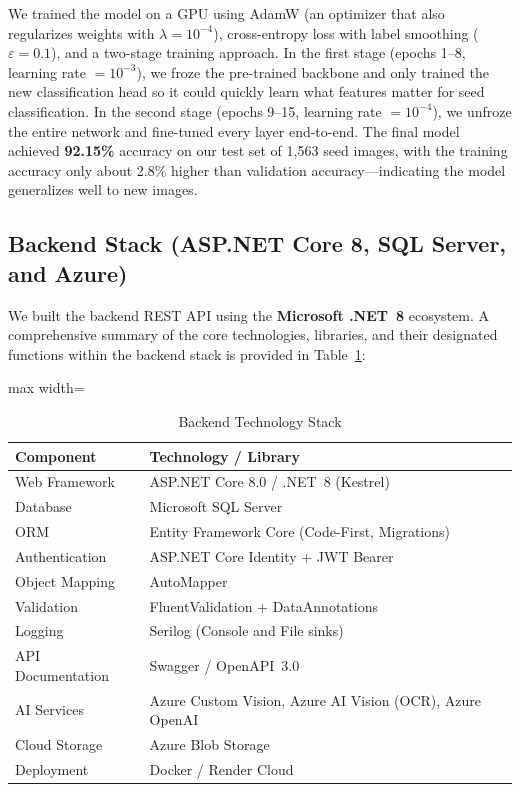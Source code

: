 We trained the model on a GPU using AdamW (an optimizer that also regularizes
weights with $\lambda = 10^{-4}$), cross-entropy loss with label smoothing
($\varepsilon = 0.1$), and a two-stage training approach. In the first stage
(epochs 1–8, learning rate $= 10^{-3}$), we froze the pre-trained backbone and
only trained the new classification head so it could quickly learn what features
matter for seed classification. In the second stage (epochs 9–15, learning rate
$= 10^{-4}$), we unfroze the entire network and fine-tuned every layer end-to-end.
The final model achieved \textbf{92.15\%} accuracy on our test set of 1{,}563 seed
images, with the training accuracy only about 2.8\% higher than validation
accuracy—indicating the model generalizes well to new images.

\subsection{Backend Stack (ASP.NET Core 8, SQL Server, and Azure)}

We built the backend REST API using the \textbf{Microsoft .NET~8} ecosystem.
A comprehensive summary of the core technologies, libraries, and their designated functions within the backend stack is provided in Table~\ref{tab:backend_stack}:

\begin{table}[htbp]
  \centering
  \caption{Backend Technology Stack}
  \label{tab:backend_stack}
  \renewcommand{\arraystretch}{1.35}
  \begin{adjustbox}{max width=\textwidth}
    \begin{tabular}{@{} l l @{}}
      \toprule
      \textbf{Component}   & \textbf{Technology / Library} \\
      \midrule
      Web Framework        & ASP.NET Core 8.0 / .NET~8 (Kestrel) \\
      Database             & Microsoft SQL Server \\
      ORM                  & Entity Framework Core (Code-First, Migrations) \\
      Authentication       & ASP.NET Core Identity + JWT Bearer \\
      Object Mapping       & AutoMapper \\
      Validation           & FluentValidation + DataAnnotations \\
      Logging              & Serilog (Console and File sinks) \\
      API Documentation    & Swagger / OpenAPI~3.0 \\
      AI Services          & Azure Custom Vision, Azure AI Vision (OCR), Azure OpenAI \\
      Cloud Storage        & Azure Blob Storage \\
      Deployment           & Docker / Render Cloud \\
      \bottomrule
    \end{tabular}
  \end{adjustbox}
\end{table}

